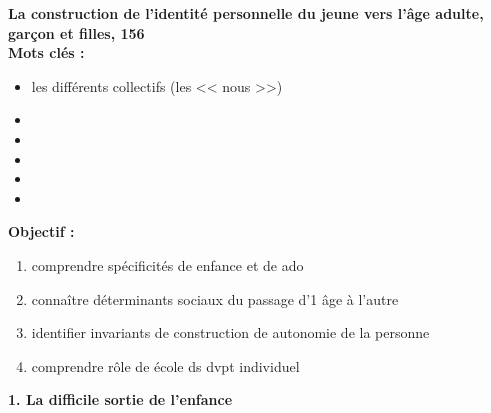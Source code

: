 \documentclass[12pt]{article}
\begin{document}
\textbf{La construction de l'identité personnelle du jeune vers l'âge adulte, garçon et filles, 156} \\

\textbf{Mots clés : }
\begin{itemize}
\item les différents collectifs (les << nous >>)
\item 
\item 
\item 
\item 
\item 
\end{itemize}

\vspace{0.5cm}

\textbf{Objectif :}


\begin{enumerate}
\item comprendre spécificités de enfance et de ado
\item connaître déterminants sociaux du passage d'1 âge à l'autre
\item identifier invariants de construction de autonomie de la personne
\item comprendre rôle de école ds dvpt individuel \\
\end{enumerate}

\textbf{1. La difficile sortie de l'enfance} \\
\end{document}
